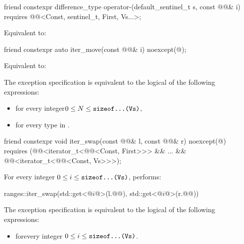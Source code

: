 \begin{itemdecl}
friend constexpr difference_type operator-(default_sentinel_t s, const @@& i)
  requires @@<Const, sentinel_t, First, Vs...>;
\end{itemdecl}

\begin{itemdescr}
\pnum
\effects
Equivalent to: 
\end{itemdescr}

\begin{itemdecl}
friend constexpr auto iter_move(const @@& i) noexcept(@\seebelow@);
\end{itemdecl}

\begin{itemdescr}
\pnum
\effects
Equivalent to: 

\pnum
\remarks
The exception specification is equivalent to
the logical  of the following expressions:
\begin{itemize}
\item
{}
for every integer\newline $0 \le N \le \texttt{\protect sizeof...(Vs)}$,
\item
{}\newline
for every type  in .
\end{itemize}
\end{itemdescr}

\begin{itemdecl}
friend constexpr void iter_swap(const @@& l, const @@& r) noexcept(@\seebelow@)
  requires (@@<iterator_t<@@<Const, First>>> && ... &&
        @@<iterator_t<@@<Const, Vs>>>);
\end{itemdecl}

\begin{itemdescr}
\pnum
\effects
For every integer $0 \le i \le \texttt{\protect sizeof...(Vs)}$, performs:
\begin{codeblock}
ranges::iter_swap(std::get<@$i$@>(l.@@), std::get<@$i$@>(r.@@))
\end{codeblock}

\pnum
\remarks
The exception specification is equivalent to the logical  of the following expressions:
\begin{itemize}
\item
{}
for\newline every integer $0 \le i \le \texttt{\protect sizeof...(Vs)}$.
\end{itemize}
\end{itemdescr}

